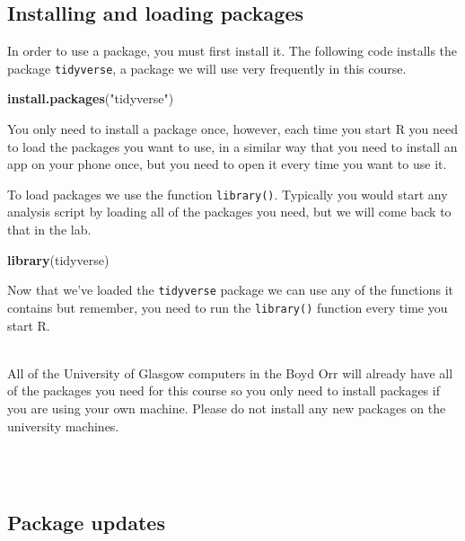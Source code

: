 \documentclass[]{book}
\newenvironment{Shaded}{\begin{snugshade}}{\end{snugshade}}
\newcommand{\KeywordTok}[1]{\textcolor[rgb]{0.13,0.29,0.53}{\textbf{#1}}}
\newcommand{\NormalTok}[1]{#1}
\newcommand{\StringTok}[1]{\textcolor[rgb]{0.31,0.60,0.02}{#1}}
\newenvironment{info}
    {
    \hline\\
    }
    { 
    \\\\\hline
    }
\begin{document}
\hypertarget{installing-and-loading-packages}{%
\subsection{Installing and loading packages}\label{installing-and-loading-packages}}

In order to use a package, you must first install it. The following code installs the package \texttt{tidyverse}, a package we will use very frequently in this course.

\begin{Shaded}
\begin{Highlighting}[]
\KeywordTok{install.packages}\NormalTok{(}\StringTok{"tidyverse"}\NormalTok{)}
\end{Highlighting}
\end{Shaded}

You only need to install a package once, however, each time you start R you need to load the packages you want to use, in a similar way that you need to install an app on your phone once, but you need to open it every time you want to use it.

To load packages we use the function \texttt{library()}. Typically you would start any analysis script by loading all of the packages you need, but we will come back to that in the lab.

\begin{Shaded}
\begin{Highlighting}[]
\KeywordTok{library}\NormalTok{(tidyverse)}
\end{Highlighting}
\end{Shaded}

Now that we've loaded the \texttt{tidyverse} package we can use any of the functions it contains but remember, you need to run the \texttt{library()} function every time you start R.

\begin{info}
All of the University of Glasgow computers in the Boyd Orr will already
have all of the packages you need for this course so you only need to
install packages if you are using your own machine. Please do not
install any new packages on the university machines.
\end{info}

\hypertarget{package-updates}{%
\subsection{Package updates}\label{package-updates}}
\end{document}
